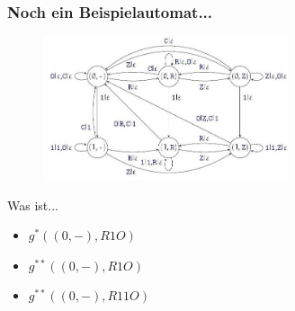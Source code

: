 \begin{frame}
	\frametitle{Noch ein Beispielautomat...}
		\begin{figure}
			\centering
				\includegraphics[height=4.2cm]{src/tut10_automat2.jpg}
		\end{figure}
		Was ist...
		\begin{itemize}
	    \item $g^*((0,-), R1O)$\only<1>{?}\only<2->{$= R$}
	    \item $g^{**}((0,-), R1O)$\only<3->{$= R$}
	    \item $g^{**}((0,-), R11O)$\only<4->{$= 1R$}
		\end{itemize}
\end{frame}

